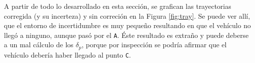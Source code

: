 	A partir de todo lo desarrollado en esta sección, se grafican las trayectorias corregida (y su incerteza) y sin correción en la Figura \ref{fig:tray}. Se puede ver allí, que el entorno de incertidumbre es muy pequeño resultando en que el vehículo no llegó a ninguno, aunque pasó por el \texttt{A}. Éste resultado es extraño y puede deberse a un mal cálculo de los $\delta_p$, porque por inspección se podría afirmar que el vehículo debería haber llegado al punto \texttt{C}.

